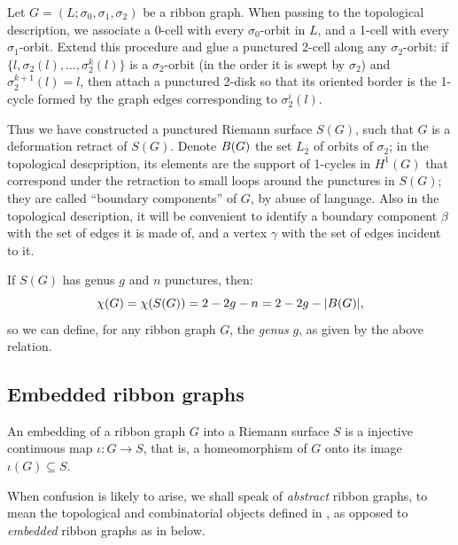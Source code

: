 Let $G = (L; \sigma_0, \sigma_1, \sigma_2)$ be a ribbon graph.  When passing to the
topological description, we associate a 0-cell with every $\sigma_0$-orbit
in $L$, and a 1-cell with every $\sigma_1$-orbit.  Extend this procedure
and glue a punctured 2-cell along any $\sigma_2$-orbit: if $\{l, \sigma_2(l), \ldots,
\sigma_2^k(l)\}$ is a $\sigma_2$-orbit (in the order it is swept by $\sigma_2$) and
$\sigma_2^{k+1}(l) = l$, then attach a punctured 2-disk so that its oriented
border is the 1-cycle formed by the graph edges corresponding to
$\sigma_2^i(l)$.

Thus we have constructed a punctured Riemann surface $S(G)$, such that
$G$ is a deformation retract of $S(G)$.  Denote $B(G)$ the set
$L_2$ of orbits of $\sigma_2$; in the topological descpription, its
elements are the support of 1-cycles in $H^1(G)$ that correspond under
the retraction to small loops around the punctures in $S(G)$; they are
called ``boundary components'' of $G$, by abuse of language.  Also in
the topological description, it will be convenient to identify a
boundary component $\beta$ with the set of edges it is made of, and a
vertex $\gamma$ with the set of edges incident to it.

\begin{definition}
  If $S(G)$ has genus $g$ and $n$ punctures, then:
  \begin{equation*}
    \chi(G) = \chi(S(G)) = 2 - 2g - n = 2 - 2g - \lvert B(G)\rvert,
  \end{equation*}
  so we can define, for any ribbon graph $G$, the \emph{genus} $g$, as
  given by the above relation.
\end{definition}


\subsection{Embedded ribbon graphs}
\label{sec:embedded-rg}

An embedding of a ribbon graph $G$ into a Riemann surface $S$ is a
injective continuous map $\iota:G\to S$, that is, a homeomorphism of $G$ onto
its image $\iota(G) \subseteq S$.

\begin{remark}
  When confusion is likely to arise, we shall speak of \emph{abstract}
  ribbon graphs, to mean the topological and combinatorial objects
  defined in , as opposed to \emph{embedded}
  ribbon graphs as in  below.
\end{remark}

